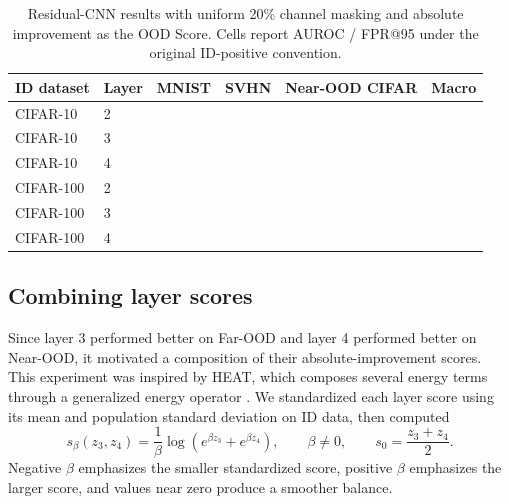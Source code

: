 \begin{table}[ht]
\centering
\small
{}
\begin{tabularx}{\textwidth}{@{}L{1.75cm}L{1.1cm}*{4}{>{\centering\arraybackslash}X}@{}}
\toprule
ID dataset & Layer & MNIST & SVHN & Near-OOD CIFAR & Macro \\
\midrule
CIFAR-10 & 2 &  &  &
 &  \\
CIFAR-10 & 3 &  &  &
 &  \\
CIFAR-10 & 4 &  &  &
 &  \\
\midrule
\mbox{CIFAR-100} & 2 &  &  &
 &  \\
\mbox{CIFAR-100} & 3 &  &  &
 &  \\
\mbox{CIFAR-100} & 4 &  &  &
 &  \\
\bottomrule
\end{tabularx}
\caption{Residual-CNN results with uniform 20\% channel masking and absolute
improvement as the OOD Score. Cells report AUROC / FPR@95 under the original
ID-positive convention.}
\label{tab:channel-denoising-results}
\end{table}

\subsection{Combining layer scores}

\headingindent
Since layer 3 performed better on Far-OOD and layer 4 performed better on Near-OOD, 
it motivated a composition
of their absolute-improvement scores. This experiment was inspired by HEAT,
which composes several energy terms through a generalized energy operator
\cite{lafon2023heat}. We standardized each layer score using its mean and
population standard deviation on ID data, then computed
\[
 s_\beta(z_3,z_4)=\frac{1}{\beta}
 \log\left(e^{\beta z_3}+e^{\beta z_4}\right),\qquad \beta\ne0,
 \qquad
 s_0=\frac{z_3+z_4}{2}.
\]
Negative $\beta$ emphasizes the smaller standardized score, positive $\beta$
emphasizes the larger score, and values near zero produce a smoother balance.

